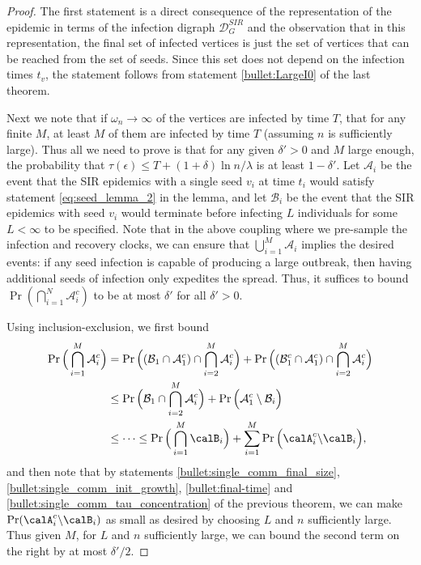 \documentclass[11pt]{article}
\begin{document}
\begin{proof}
The first statement is a direct consequence of the representation of the epidemic in terms of the infection digraph $\mathcal D_{G}^{SIR}$
and the observation that in this representation, the final set of infected vertices is just the set of vertices that can be reached from the set of seeds.  Since this set does not depend on the infection times $t_v$, the statement follows from statement \ref{bullet:LargeI0} of the last theorem.



Next we note that if $\omega_n\to\infty$ of the vertices are infected by time $T$, that for any finite $M$, at least $M$ of them are infected by time $T$ (assuming $n$ is sufficiently large).  Thus all we need to prove is that for any given $\delta'>0$ and $M$ large enough, the probability that $\tau(\epsilon)\leq T+ (1+\delta)\ln n /\lambda$ is at least $1-\delta'$.
Let $\mathcal{A}_i$ be the event that the SIR epidemics with a single seed $v_i$ at time $t_i$ would satisfy statement \ref{eq:seed_lemma_2} in the lemma, and  let $\mathcal{B}_i$ be the event that the SIR epidemics with seed  $v_i$   would terminate before infecting $L$ individuals for some $L<\infty$ to be specified. Note that in the above coupling where we pre-sample the infection and recovery clocks,  we can ensure that $\bigcup_{i=1}^M \mathcal{A}_i$ implies the desired events: if any seed infection is capable of producing a large outbreak, then having additional seeds of infection only expedites the spread. Thus, it suffices to bound $\Pr(\bigcap_{i=1}^N \mathcal{A}_i^c)$ to be at most $\delta'$ for all $\delta'>0$.

Using inclusion-exclusion, we first bound
\begin{equation}\label{multi-seed-bound}
    \begin{aligned}
        \Pr\Big(\bigcap_{i=1}^M \mathcal{A}_i^c\Big) &= 
        \Pr\Big((\mathcal B_1\cap \mathcal A_1^c)\cap\bigcap_{i=2}^M \mathcal{A}_i^c\Big) +  \Pr\Big(({\mathcal B}_1^c\cap\mathcal A_1^c)\cap\bigcap_{i=2}^M \mathcal{A}_i^c\Big) \\
        &\leq   \Pr\Big(\mathcal B_1\cap\bigcap_{i=2}^M \mathcal{A}_i^c\Big) +  \Pr\Big(\mathcal{A}_1^c\setminus \mathcal B_i\Big)\\
        &\leq\cdots\leq  \Pr\Big(\bigcap_{i=1}^M \calB_i\Big) + \sum_{i=1}^M\Pr\Big(\calA_i^c\backslash\calB_i\Big),
    \end{aligned}
\end{equation}
and then note that by statements \ref{bullet:single_comm_final_size}, \ref{bullet:single_comm_init_growth}, \ref{bullet:final-time} and \ref{bullet:single_comm_tau_concentration} of the previous theorem, we can make $\Pr(\calA_i^c\backslash\calB_i)$ as small as desired by choosing $L$ and $n$ sufficiently large. Thus given $M$, for $L$ and $n$ sufficiently large, we can bound the second term on the right  by at most $\delta'/2$.



\end{proof}
\end{document}
